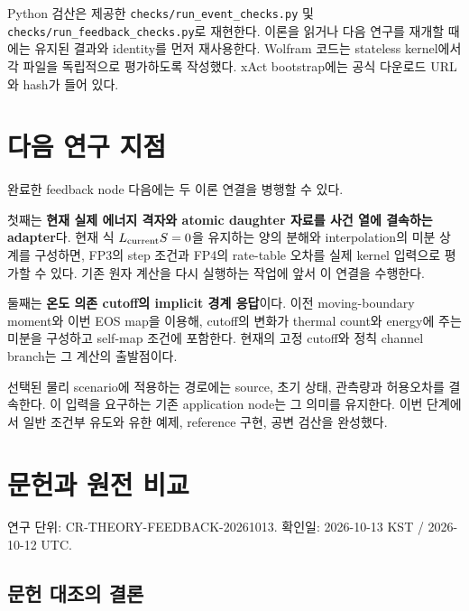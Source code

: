 Python 검산은 제공한 \texttt{checks/run\_event\_checks.py} 및 \texttt{checks/run\_feedback\_checks.py}로 재현한다. 이론을 읽거나 다음 연구를 재개할 때에는 유지된 결과와 identity를 먼저 재사용한다. Wolfram 코드는 stateless kernel에서 각 파일을 독립적으로 평가하도록 작성했다. xAct bootstrap에는 공식 다운로드 URL와 hash가 들어 있다.

\hypertarget{uxb2e4uxc74c-uxc5f0uxad6c-uxc9c0uxc810}{%
\section{다음 연구 지점}\label{uxb2e4uxc74c-uxc5f0uxad6c-uxc9c0uxc810}}

완료한 feedback node 다음에는 두 이론 연결을 병행할 수 있다.

첫째는 \textbf{현재 실제 에너지 격자와 atomic daughter 자료를 사건 열에 결속하는 adapter}다. 현재 식 \(L_{\rm current}S=0\)을 유지하는 양의 분해와 interpolation의 미분 상계를 구성하면, FP3의 step 조건과 FP4의 rate-table 오차를 실제 kernel 입력으로 평가할 수 있다. 기존 원자 계산을 다시 실행하는 작업에 앞서 이 연결을 수행한다.

둘째는 \textbf{온도 의존 cutoff의 implicit 경계 응답}이다. 이전 moving-boundary moment와 이번 EOS map을 이용해, cutoff의 변화가 thermal count와 energy에 주는 미분을 구성하고 self-map 조건에 포함한다. 현재의 고정 cutoff와 정칙 channel branch는 그 계산의 출발점이다.

선택된 물리 scenario에 적용하는 경로에는 source, 초기 상태, 관측량과 허용오차를 결속한다. 이 입력을 요구하는 기존 application node는 그 의미를 유지한다. 이번 단계에서 일반 조건부 유도와 유한 예제, reference 구현, 공변 검산을 완성했다.

\hypertarget{uxbb38uxd5ccuxacfc-uxc6d0uxc804-uxbe44uxad50}{%
\section{문헌과 원전 비교}\label{uxbb38uxd5ccuxacfc-uxc6d0uxc804-uxbe44uxad50}}

\begingroup
\small

연구 단위: CR-THEORY-FEEDBACK-20261013. 확인일: 2026-10-13 KST / 2026-10-12 UTC.

\hypertarget{uxbb38uxd5cc-uxb300uxc870uxc758-uxacb0uxb860}{%
\subsection{문헌 대조의 결론}\label{uxbb38uxd5cc-uxb300uxc870uxc758-uxacb0uxb860}}

